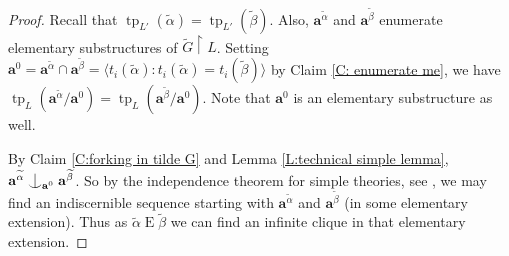 \documentclass[a4paper]{amsart}
\theoremstyle{plain}
\newtheorem{claim}{Claim}[theorem]
\theoremstyle{definition}
\theoremstyle{remark}
\numberwithin{equation}{section}
\newcommand{\forkindep}[1][]{%
  \mathrel{
    \mathop{
      \vcenter{
        \hbox{\oalign{\noalign{\kern-.3ex}\hfil$\vert$\hfil\cr
              \noalign{\kern-.7ex}
              $\smile$\cr\noalign{\kern-.3ex}}}
      }
    }\displaylimits_{#1}
  }
}
\newenvironment{claimproof}[1][\proofname]
  {%
    \proof[#1]%
      \renewcommand*\qedsymbol{$\square$ (claim)}%
  }
  {%
    \endproof%
  }
\DeclareMathOperator{\tp}{tp}
\begin{document}
\begin{proof}
Recall that $\tp_{L'}(\widetilde \alpha)=\tp_{L'}(\widetilde \beta)$. Also, $\mathbf{a}^{\widetilde \alpha}$ and $\mathbf{a}^{\widetilde \beta}$ enumerate elementary substructures  of $\widetilde G\restriction L$. Setting $\mathbf{a}^0=\mathbf{a}^{\widetilde \alpha}\cap \mathbf{a}^{\widetilde\beta}=\langle t_i(\widetilde \alpha):t_i(\widetilde \alpha)=t_i(\widetilde \beta)\rangle$ by Claim \ref{C: enumerate me}, we have $\tp_L(\mathbf{a}^{\widetilde \alpha}/\mathbf{a}^0)=\tp_L(\mathbf{a}^{\widetilde \beta}/\mathbf{a}^0)$. Note that $\mathbf{a}^0$ is an elementary substructure as well.
%
%





By Claim \ref{C:forking in tilde G} and Lemma \ref{L:technical simple lemma}, $\mathbf{a}^{\widetilde \alpha}\forkindep[\mathbf{a}^0]\mathbf{a}^{\widetilde \beta}$. So by the independence theorem for simple theories, see  \cite[Lemma 7.4.8]{TZ}, we may find an indiscernible sequence starting with $\mathbf{a}^{\widetilde \alpha}$ and $\mathbf{a}^{\widetilde \beta}$ (in some elementary extension). Thus as $\widetilde \alpha\mathrel{E} \widetilde \beta$ we can find an infinite clique in that elementary extension.
\end{proof}
\end{document}
